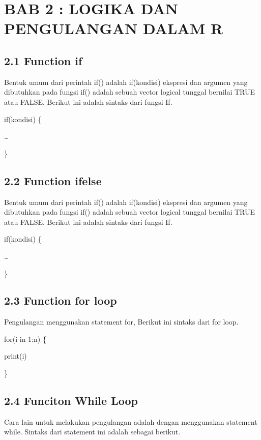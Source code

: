 \documentclass[
]{article}
\begin{document}
\section{BAB 2 : LOGIKA DAN PENGULANGAN DALAM
R}\label{bab-2-logika-dan-pengulangan-dalam-r}

\subsection{2.1 Function if}\label{function-if}

Bentuk umum dari perintah if() adalah if(kondisi) ekspresi dan argumen
yang dibutuhkan pada fungsi if() adalah sebuah vector logical tunggal
bernilai TRUE atau FALSE. Berikut ini adalah sintaks dari fungsi If.

if(kondisi) \{

\ldots{}

\}

\subsection{\texorpdfstring{2.2 \textbf{Function
ifelse}}{2.2 Function ifelse}}\label{function-ifelse}

Bentuk umum dari perintah if() adalah if(kondisi) ekspresi dan argumen
yang dibutuhkan pada fungsi if() adalah sebuah vector logical tunggal
bernilai TRUE atau FALSE. Berikut ini adalah sintaks dari fungsi If.

if(kondisi) \{

\ldots{}

\}

\subsection{2.3 Function for loop}\label{function-for-loop}

Pengulangan menggunakan statement for, Berikut ini sintaks dari for
loop.

for(i in 1:n) \{

print(i)

\}

\subsection{2.4 Funciton While Loop}\label{funciton-while-loop}

Cara lain untuk melakukan pengulangan adalah dengan menggunakan
statement while. Sintaks dari statement ini adalah sebagai berikut.
\end{document}
